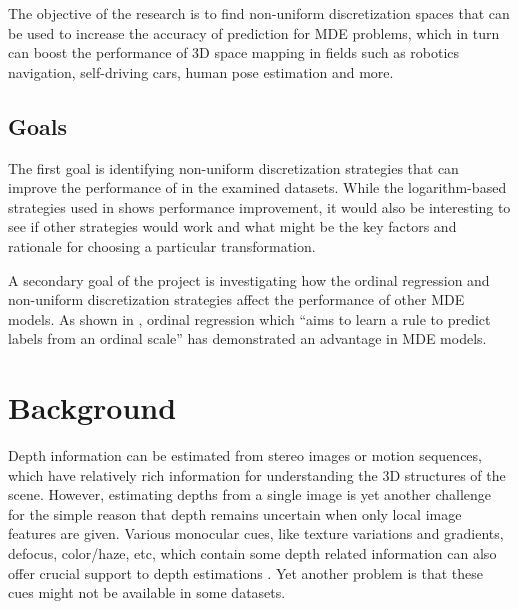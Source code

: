 \documentclass[12pt,twoside]{article}
\begin{document}
The objective of the research is to find non-uniform discretization spaces that can be used to increase the accuracy of prediction for MDE problems, which in turn can boost the performance of 3D space mapping in fields such as robotics navigation, self-driving cars, human pose estimation and more. 

\subsection{Goals}
The first goal is identifying non-uniform discretization strategies that can improve the performance of \cite{huan_fu_deep_2018} in the examined datasets. While the logarithm-based strategies used in \cite{huan_fu_deep_2018} shows performance improvement, it would also be interesting to see if other strategies would work and what might be the key factors and rationale for choosing a particular transformation.

A secondary goal of the project is investigating how the ordinal regression and non-uniform discretization strategies affect the performance of other MDE models. As shown in \cite{huan_fu_deep_2018}, ordinal regression which ``aims to learn a rule to predict labels from an ordinal scale'' has demonstrated an advantage in MDE models.

\section{Background}
Depth information can be estimated from stereo images or motion sequences, which have relatively rich information for understanding the 3D structures of the scene. However, estimating depths from a single image is yet another challenge for the simple reason that depth remains uncertain when only local image features are given. Various monocular cues, like texture variations and gradients, defocus, color/haze, etc, which contain some depth related information can also offer crucial support to depth estimations \cite{saloni_bahadur_literature_2017}. Yet another problem is that these cues might not be available in some datasets.
\end{document}
